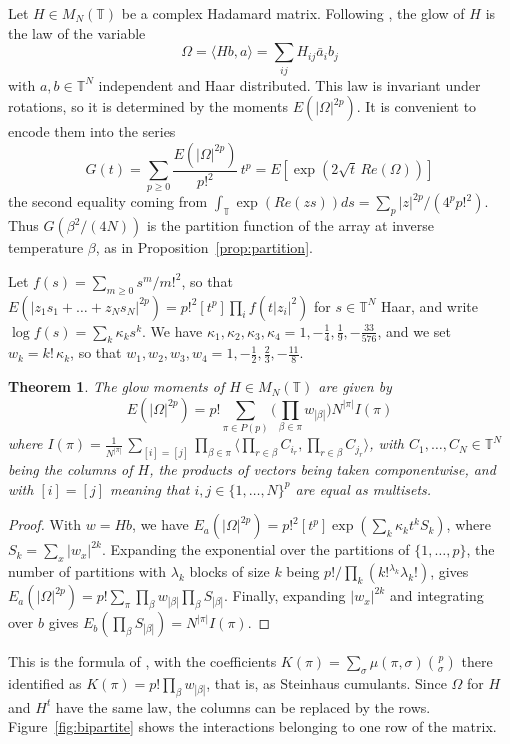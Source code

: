 \documentclass[11pt,a4paper]{article}
\newtheorem{thm}{Theorem}[section]
\theoremstyle{remark}
\begin{document}
Let $H\in M_N(\mathbb T)$ be a complex Hadamard matrix. Following \cite{ba0,banica}, the glow of $H$ is the law of the variable
$$\Omega=\langle Hb,a\rangle=\sum_{ij}H_{ij}\bar a_ib_j$$
with $a,b\in\mathbb T^N$ independent and Haar distributed. This law is invariant under rotations, so it is determined by the moments $E(|\Omega|^{2p})$. It is convenient to encode them into the series
$$G(t)=\sum_{p\geq0}\frac{E(|\Omega|^{2p})}{p!^2}\,t^p=E\left[\exp\left(2\sqrt{t}\,Re(\Omega)\right)\right]$$
the second equality coming from $\int_\mathbb T\exp(Re(zs))ds=\sum_p|z|^{2p}/(4^pp!^2)$. Thus $G(\beta^2/(4N))$ is the partition function of the array at inverse temperature $\beta$, as in Proposition~\ref{prop:partition}.

Let $f(s)=\sum_{m\geq0}s^m/m!^2$, so that $E(|z_1s_1+\ldots+z_Ns_N|^{2p})=p!^2[t^p]\prod_if(t|z_i|^2)$ for $s\in\mathbb T^N$ Haar, and write $\log f(s)=\sum_k\kappa_ks^k$. We have $\kappa_1,\kappa_2,\kappa_3,\kappa_4=1,-\frac{1}{4},\frac{1}{9},-\frac{33}{576}$, and we set $w_k=k!\,\kappa_k$, so that $w_1,w_2,w_3,w_4=1,-\frac{1}{2},\frac{2}{3},-\frac{11}{8}$.

\begin{samepage}
\begin{thm}\label{thm:mom}
The glow moments of $H\in M_N(\mathbb T)$ are given by
$$E(|\Omega|^{2p})=p!\sum_{\pi\in P(p)}\Big(\prod_{\beta\in\pi}w_{|\beta|}\Big)N^{|\pi|}I(\pi)$$
where $I(\pi)=\frac{1}{N^{|\pi|}}\,\sum_{[i]=[j]}\prod_{\beta\in\pi}\big\langle\prod_{r\in\beta}C_{i_r},\prod_{r\in\beta}C_{j_r}\big\rangle$, with $C_1,\ldots,C_N\in\mathbb T^N$ being the columns of $H$, the products of vectors being taken componentwise, and with $[i]=[j]$ meaning that $i,j\in\{1,\ldots,N\}^p$ are equal as multisets.
\end{thm}
\end{samepage}

\begin{proof}
With $w=Hb$, we have $E_a(|\Omega|^{2p})=p!^2[t^p]\exp(\sum_k\kappa_kt^kS_k)$, where $S_k=\sum_x|w_x|^{2k}$. Expanding the exponential over the partitions of $\{1,\ldots,p\}$, the number of partitions with $\lambda_k$ blocks of size $k$ being $p!/\prod_k(k!^{\lambda_k}\lambda_k!)$, gives $E_a(|\Omega|^{2p})=p!\sum_\pi\prod_\beta w_{|\beta|}\prod_\beta S_{|\beta|}$. Finally, expanding $|w_x|^{2k}$ and integrating over $b$ gives $E_b\left(\prod_\beta S_{|\beta|}\right)=N^{|\pi|}I(\pi)$.
\end{proof}

This is the formula of \cite[Proposition 2.2]{banica}, with the coefficients $K(\pi)=\sum_\sigma\mu(\pi,\sigma)\binom{p}{\sigma}$ there identified as $K(\pi)=p!\prod_\beta w_{|\beta|}$, that is, as Steinhaus cumulants. Since $\Omega$ for $H$ and $H^t$ have the same law, the columns can be replaced by the rows. Figure~\ref{fig:bipartite} shows the interactions belonging to one row of the matrix.
\end{document}
